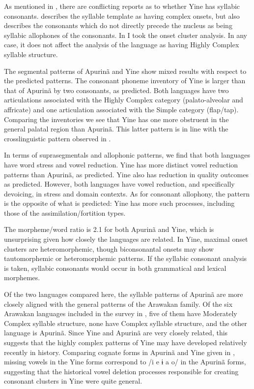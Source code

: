   As mentioned in , there are conflicting reports as to whether Yine has syllabic consonants. \citet{Matteson1965} describes the syllable template as having complex onsets, but also describes the consonants which do not directly precede the nucleus as being syllabic allophones of the consonants. In  I took the onset cluster analysis. In any case, it does not affect the analysis of the language as having Highly Complex syllable structure.

  The segmental patterns of Apurinã and Yine show mixed results with respect to the predicted patterns. The consonant phoneme inventory of Yine is larger than that of Apurinã by two consonants, as predicted. Both languages have two articulations associated with the Highly Complex category (palato-alveolar and affricate) and one articulation associated with the Simple category (flap/tap). Comparing the inventories we see that Yine has one more obstruent in the general palatal region than Apurinã. This latter pattern is in line with the crosslinguistic pattern observed in .

  In terms of suprasegmentals and allophonic patterns, we find that both languages have word stress and vowel reduction. Yine has more distinct vowel reduction patterns than Apurinã, as predicted. Yine also has reduction in quality outcomes as predicted. However, both languages have vowel reduction, and specifically devoicing, in stress and domain contexts. As for consonant allophony, the pattern is the opposite of what is predicted: Yine has more such processes, including those of the assimilation/fortition types.

  The morpheme/word ratio is 2.1 for both Apurinã and Yine, which is unsurprising given how closely the languages are related. In Yine, maximal onset clusters are heteromorphemic, though biconsonantal onsets may show tautomorphemic or heteromorphemic patterns. If the syllabic consonant analysis is taken, syllabic consonants would occur in both grammatical and lexical morphemes.

  Of the two languages compared here, the syllable patterns of Apurinã are more closely aligned with the general patterns of the Arawakan family. Of the six Arawakan languages included in the survey in \citet{Maddieson2013a}, five of them have Moderately Complex syllable structure, none have Complex syllable structure, and the other language is Apurinã. Since Yine and Apurinã are very closely related, this suggests that the highly complex patterns of Yine may have developed relatively recently in history. Comparing cognate forms in Apurinã and Yine given in \citet[88-9]{Facundes2002}, missing vowels in the Yine forms correspond to /i e ɨ a o/ in the Apurinã forms, suggesting that the historical vowel deletion processes responsible for creating consonant clusters in Yine were quite general.

